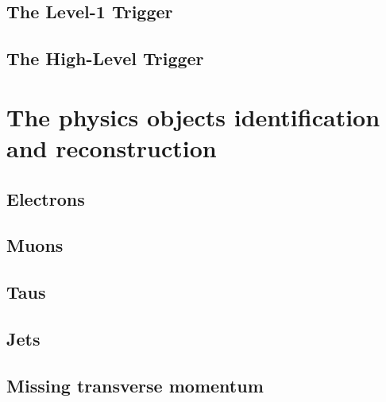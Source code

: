 \subsection{The Level-1 Trigger}
\subsection{The High-Level Trigger}

\section{The physics objects identification and reconstruction}
\subsection{Electrons}
\subsection{Muons}
\subsection{Taus}
\subsection{Jets}
\subsection{Missing transverse momentum}
